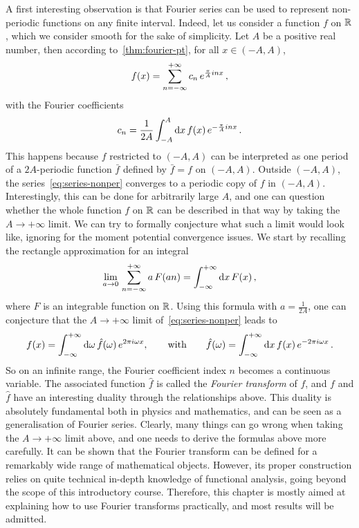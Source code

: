 A first interesting observation is that Fourier series can be used to represent
non-periodic functions on any finite interval. Indeed, let us consider a function $f$ on
$\mathbb{R}$, which we consider smooth for the sake of simplicity. Let $A$ be a positive real
number, then according to~\cref{thm:fourier-pt}, for all $x\in(-A,A)$,
\begin{equation}
  f(x)=\sum_{n=-\infty}^{+\infty}c_n\,e^{\frac{\pi}{A}inx}\,,\label{eq:series-nonper}
\end{equation}
with the Fourier coefficients
\begin{equation}
  c_n=\frac{1}{2A}\int_{-A}^{A}\mathrm{d} x\,f(x)\,e^{-\frac{\pi}{A}inx}\,.\label{eq:cn-nonper}
\end{equation}
This happens because $f$ restricted to $(-A,A)$ can be interpreted as one period of a
$2A$-periodic function $\bar{f}$ defined by $\bar{f}=f$ on $(-A,A)$. Outside $(-A,A)$, the
series~\cref{eq:series-nonper} converges to a periodic copy of $f$ in $(-A,A)$.
Interestingly, this can be done for arbitrarily large $A$, and one can question whether
the whole function $f$ on $\mathbb{R}$ can be described in that way by taking the $A\to+\infty$
limit. We can try to formally conjecture what such a limit would look like, ignoring for
the moment potential convergence issues. We start by recalling the rectangle approximation
for an integral
\begin{equation}
  \lim_{a\to0}\,\sum_{n=-\infty}^{+\infty}a\,F(an)=\int_{-\infty}^{+\infty}\mathrm{d} x\, F(x)\,,
\end{equation}
where $F$ is an integrable function on $\mathbb{R}$. Using this formula with $a=\frac{1}{2A}$, one
can conjecture that the $A\to+\infty$ limit of~\cref{eq:series-nonper} leads to
\begin{equation}
  f(x)=\int_{-\infty}^{+\infty}\mathrm{d}\omega\,\hat{f}(\omega)\,e^{2\pi i\omega x},
  \qquad\text{with}\qquad
  \hat{f}(\omega)=\int_{-\infty}^{+\infty}\mathrm{d} x\,f(x)\,e^{-2\pi i\omega x}\,.
\end{equation}
So on an infinite range, the Fourier coefficient index $n$ becomes a continuous variable.
The associated function $\hat{f}$ is called the \emph{Fourier transform} of $f$, and $f$
and $\hat{f}$ have an interesting duality through the relationships above. This duality is
absolutely fundamental both in physics and mathematics, and can be seen as a
generalisation of Fourier series. Clearly, many things can go wrong when taking the
$A\to+\infty$ limit above, and one needs to derive the formulas above more carefully. It
can be shown that the Fourier transform can be defined for a remarkably wide range of
mathematical objects. However, its proper construction relies on quite technical in-depth
knowledge of functional analysis, going beyond the scope of this introductory course.
Therefore, this chapter is mostly aimed at explaining how to use Fourier transforms
practically, and most results will be admitted.

